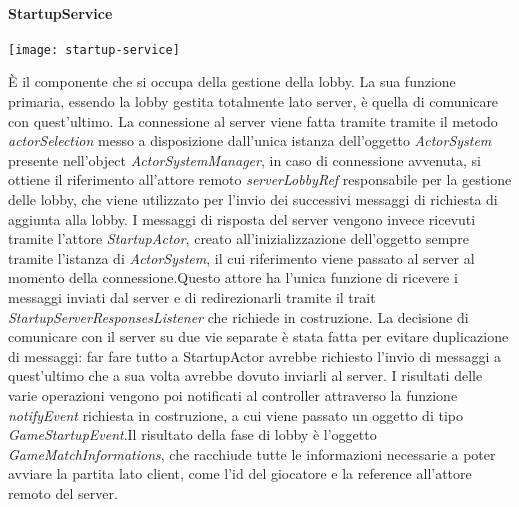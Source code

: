 \paragraph{StartupService}
\begin{center}
    \texttt{[image: startup-service]}
\end{center}
È il componente che si occupa della gestione della lobby.
La sua funzione primaria, essendo la lobby gestita totalmente lato server, è quella di comunicare con quest’ultimo. \newline La connessione al server viene fatta tramite tramite il metodo \textit{actorSelection} messo a disposizione dall’unica istanza dell’oggetto \textit{ActorSystem} presente nell’object \textit{ActorSystemManager}, in caso di connessione avvenuta, si ottiene il riferimento all’attore remoto \textit{serverLobbyRef} responsabile per la gestione delle lobby, che viene utilizzato per l’invio dei successivi messaggi di richiesta di aggiunta alla lobby. \newline
I messaggi di risposta del server vengono invece ricevuti tramite l’attore \textit{StartupActor}, creato all’inizializzazione dell’oggetto sempre tramite l’istanza di \textit{ActorSystem}, il cui riferimento viene passato al server al momento della connessione.\newline Questo attore ha l’unica funzione di ricevere i messaggi inviati dal server e di redirezionarli tramite il trait \textit{StartupServerResponsesListener} che richiede in costruzione.\newline
La decisione di comunicare con il server su due vie separate è stata fatta per evitare duplicazione di messaggi: far fare tutto a StartupActor avrebbe richiesto l’invio di messaggi a quest’ultimo che a sua volta avrebbe dovuto inviarli al server.
I risultati delle varie operazioni vengono poi notificati al controller attraverso la funzione \textit{notifyEvent} richiesta in costruzione, a cui viene passato un oggetto di tipo \textit{GameStartupEvent}.\newline Il risultato della fase di lobby è l’oggetto \textit{GameMatchInformations}, che racchiude tutte le informazioni necessarie a poter avviare la partita lato client, come l'id del giocatore e la reference all'attore remoto del server.
